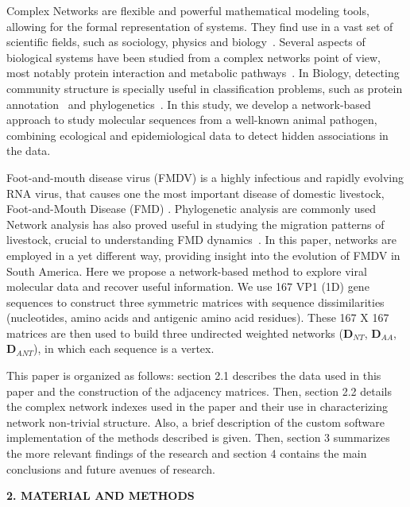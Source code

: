 \documentclass[12pt]{article}
\begin{document}
Complex Networks are flexible and powerful mathematical modeling tools, allowing  for the formal representation of systems.
They find use in a vast set of scientific fields, such as sociology, physics and biology~\cite{Barabasi2004,newman,surprise1,surprise2,watts,guell2012}.
Several aspects of biological systems have been studied from a complex networks point of view, most notably protein interaction and metabolic pathways~\cite{GoesNeto2010, surprise2, metabolic, guell2012}.
In Biology, detecting community structure is specially useful in classification problems, such as protein annotation~\cite{surprise2} and phylogenetics~\cite{Andrade2011}.
In this study, we develop a network-based approach to study molecular sequences from a well-known animal pathogen, combining ecological and epidemiological data to detect hidden associations in the data.

Foot-and-mouth disease virus (FMDV) is a highly infectious and rapidly evolving RNA virus, that causes one the most important disease of domestic livestock, Foot-and-Mouth Disease (FMD) \cite{Malirat2007,Perez2001,Malirat2012A,andean,Carvalho2012}.
Phylogenetic analysis are commonly used 
Network analysis has also proved useful in studying the migration patterns of livestock, crucial to understanding FMD dynamics~\cite{review,cattle}.
In this paper, networks are employed in a yet different way, providing insight into the evolution of FMDV in South America.
Here we propose a network-based method to explore viral molecular data and recover useful information.
We use 167 VP1 (1D) gene sequences to construct three symmetric matrices with sequence dissimilarities (nucleotides, amino acids and antigenic amino acid residues).
These 167 X 167 matrices are then used to build three undirected weighted networks ($\mathbf{D}_{NT}$, $\mathbf{D}_{AA}$, $\mathbf{D}_{ANT}$), in which each sequence is a vertex.

This paper is organized as follows: section 2.1 describes the data used in this paper and the construction of the adjacency matrices.
Then, section 2.2 details the complex network indexes used in the paper and their use in characterizing network non-trivial structure.
Also, a brief description of the custom software implementation of the methods described is given.
Then, section 3 summarizes the more relevant findings of the research and section 4 contains the main conclusions and future avenues of research.

\bigskip
\bigskip

\textbf{2. MATERIAL AND METHODS}
\end{document}
